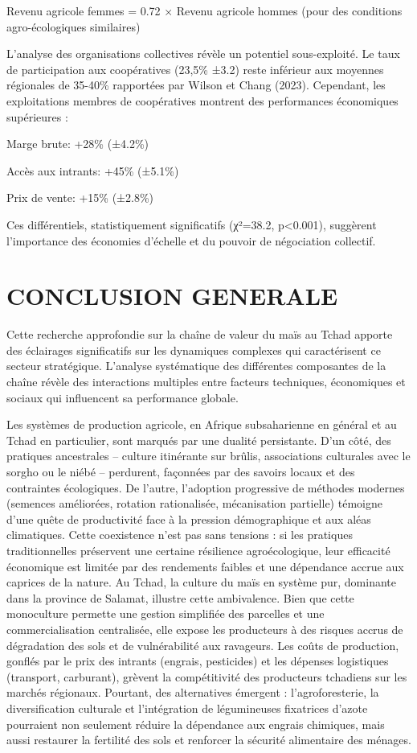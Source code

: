 \documentclass[12pt,oneside]{report}
\begin{document}
Revenu agricole femmes = 0.72 × Revenu agricole hommes (pour des conditions agro-écologiques similaires)

L'analyse des organisations collectives révèle un potentiel sous-exploité. Le taux de participation aux coopératives (23,5\% ±3.2) reste inférieur aux moyennes régionales de 35-40\% rapportées par Wilson et Chang (2023). Cependant, les exploitations membres de coopératives montrent des performances économiques supérieures :

Marge brute: +28\% (±4.2\%)

Accès aux intrants: +45\% (±5.1\%)

Prix de vente: +15\% (±2.8\%)

Ces différentiels, statistiquement significatifs (χ²=38.2, p<0.001), suggèrent l'importance des économies d'échelle et du pouvoir de négociation collectif.

\chapter{CONCLUSION GENERALE}
Cette recherche approfondie sur la chaîne de valeur du maïs au Tchad apporte des éclairages significatifs sur les dynamiques complexes qui caractérisent ce secteur stratégique. L'analyse systématique des différentes composantes de la chaîne révèle des interactions multiples entre facteurs techniques, économiques et sociaux qui influencent sa performance globale.

Les systèmes de production agricole, en Afrique subsaharienne en général et au Tchad en particulier, sont marqués par une dualité persistante. D’un côté, des pratiques ancestrales – culture itinérante sur brûlis, associations culturales avec le sorgho ou le niébé – perdurent, façonnées par des savoirs locaux et des contraintes écologiques. De l’autre, l’adoption progressive de méthodes modernes (semences améliorées, rotation rationalisée, mécanisation partielle) témoigne d’une quête de productivité face à la pression démographique et aux aléas climatiques. Cette coexistence n’est pas sans tensions : si les pratiques traditionnelles préservent une certaine résilience agroécologique, leur efficacité économique est limitée par des rendements faibles et une dépendance accrue aux caprices de la nature. Au Tchad, la culture du maïs en système pur, dominante dans la province de Salamat, illustre cette ambivalence. Bien que cette monoculture permette une gestion simplifiée des parcelles et une commercialisation centralisée, elle expose les producteurs à des risques accrus de dégradation des sols et de vulnérabilité aux ravageurs. Les coûts de production, gonflés par le prix des intrants (engrais, pesticides) et les dépenses logistiques (transport, carburant), grèvent la compétitivité des producteurs tchadiens sur les marchés régionaux. Pourtant, des alternatives émergent : l’agroforesterie, la diversification culturale et l’intégration de légumineuses fixatrices d’azote pourraient non seulement réduire la dépendance aux engrais chimiques, mais aussi restaurer la fertilité des sols et renforcer la sécurité alimentaire des ménages.
\end{document}
